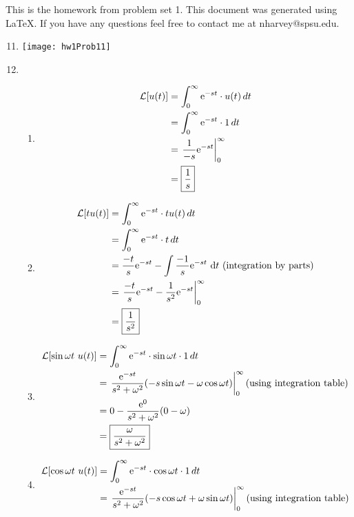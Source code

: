 \documentclass[main.tex]{subfiles}
\begin{document}
This is the homework from problem set 1. This document was generated using
\LaTeX. If you have any questions feel free to contact me at nharvey@spsu.edu.

\begin{enumerate}
	\setcounter{enumi}{10}
	\item 
		\begin{minipage}[H]{\textwidth}
			\vspace{0pt}
			\texttt{[image: hw1Prob11]}
		\end{minipage}

	\setcounter{enumi}{0}
	\item
		\begin{enumerate}
			\item 
				\begin{align*}
					\mathcal{L}[u(t)] 
					  &= \int_0^{\infty} \mathrm{e}^{-st}\cdot u(t)\, dt
					\\&= \int_0^{\infty} \mathrm{e}^{-st}\cdot 1\, dt
					\\&= \left.\frac{1}{-s}\mathrm{e}^{-st}\right|_0^{\infty}
					\\&= \boxed{\frac{1}{s}}
				\end{align*}
			\item
				\begin{align*}
					\mathcal{L}[tu(t)] 
					  &= \int_0^{\infty} \mathrm{e}^{-st}\cdot tu(t)\, dt
					\\&= \int_0^{\infty} \mathrm{e}^{-st}\cdot t\, dt
					\\&= \frac{-t}{s}\mathrm{e}^{-st} - \int{\frac{-1}{s}\mathrm{e}^{-st}\ \mathrm{d}t}\ (\mathrm{integration\ by\ parts})
					\\&= \left.\frac{-t}{s}\mathrm{e}^{-st} - \frac{1}{s^2}\mathrm{e}^{-st}\right|_0^{\infty}
					\\&= \boxed{\frac{1}{s^2}}
				\end{align*}
			\item
				\begin{align*}
					\mathcal{L}[\sin{\omega t}\ u(t)] 
						  &= \int_0^{\infty} \mathrm{e}^{-st}\cdot \sin{\omega t} \cdot 1\, dt
						\\&= \left.\frac{\mathrm{e}^{-st}}{s^2+\omega^2}(-s\sin{\omega t} - \omega\cos{\omega t})\right|_0^{\infty} \mathrm{(using\ integration\ table)}
						\\&= 0 - \frac{\mathrm{e}^0}{s^2+\omega^2}(0 - \omega)
						\\&= \boxed{\frac{\omega}{s^2+\omega^2}}
				\end{align*}
			\item
				\begin{align*}
					\Lap{\cos{\omega t}\ u(t)} 
					  &= \laplace{\cos{\omega t} \cdot 1}
					\\&= \inteval{\frac{\e^{-st}}{s^2+\omega^2}(-s\cos{\omega t} + \omega\sin{\omega t})}{0}{\infty} \mathrm{(using\ integration\ table)}

\end{align*}
\end{enumerate}
\end{enumerate}
\end{document}
